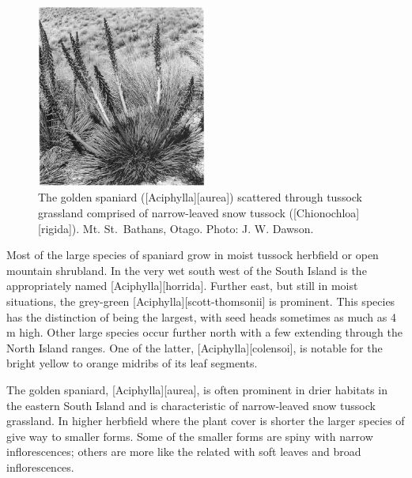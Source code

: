 \begin{figure}
	\includegraphics[width=0.5\textwidth]{graphics/figure98golden-spaniard.jpg}
	\centering
	\caption[The golden spaniard]{The golden spaniard ([Aciphylla][aurea]) scattered through tussock grassland comprised of narrow-leaved snow tussock ([Chionochloa][rigida]). Mt. St.\ Bathans, Otago.
	Photo: J. W. Dawson.}%
	\label{fig:98golden-spaniard}
\end{figure}

Most of the large species of spaniard grow in moist tussock herbfield or open mountain shrubland.
In the very wet south west of the South Island is the appropriately named [Aciphylla][horrida].
Further east, but still in moist situations, the grey-green [Aciphylla][scott-thomsonii] is prominent.
This species has the distinction of being the largest, with seed heads sometimes as much as 4 m high.
Other large species occur further north with a few extending through the North Island ranges.
One of the latter, [Aciphylla][colensoi], is notable for the bright yellow to orange midribs of its leaf segments.

The golden spaniard, [Aciphylla][aurea], is often prominent in drier habitats in the eastern South Island and is characteristic of narrow-leaved snow tussock grassland.
In higher herbfield where the plant cover is shorter the larger species of  give way to smaller forms.
Some of the smaller forms are spiny with narrow inflorescences; others are more like the related  with soft leaves and broad inflorescences.

